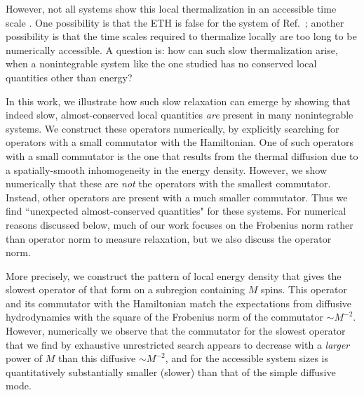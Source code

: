 \documentclass[twocolumn,superscriptaddress, prl,showpacs]{revtex4-1}
\begin{document}
However, not all systems show this local thermalization in an accessible time scale \cite{Banuls:2011}.
One possibility is that the ETH is false for the system of Ref.~; another possibility is that the time scales required to thermalize locally are too long to be numerically accessible.  A question is: how can such slow thermalization arise, when a nonintegrable system like the one studied has no conserved local quantities other than energy?

In this work, we illustrate how such slow relaxation can emerge by showing that indeed slow, almost-conserved local quantities {\it are} present in many nonintegrable systems.  We construct these operators numerically, by explicitly searching for operators with a small commutator with the Hamiltonian.
One of such operators with a small commutator is the one that results from the thermal diffusion due to a spatially-smooth inhomogeneity in the energy density.  However, we show numerically that these are {\it not} the operators with the smallest commutator.  Instead, other operators are present with a much smaller commutator.  Thus we find ``unexpected almost-conserved quantities" for these systems.  For numerical reasons discussed below, much of our work focuses on the Frobenius norm rather than operator norm to measure relaxation, but we also discuss the operator norm.


More precisely, we construct the pattern of local energy density that gives the slowest operator of that form on a subregion containing $M$ spins.  
This operator and its commutator with the Hamiltonian
match the expectations from diffusive hydrodynamics with the square of the Frobenius norm of the commutator $\sim M^{-2}$. %
However, numerically we observe that the commutator for the slowest operator that we find by exhaustive unrestricted search appears to decrease with a {\it larger} power of $M$ than this diffusive $\sim M^{-2}$, and for the accessible system sizes is quantitatively substantially smaller (slower) than that of the simple diffusive mode.
\end{document}
